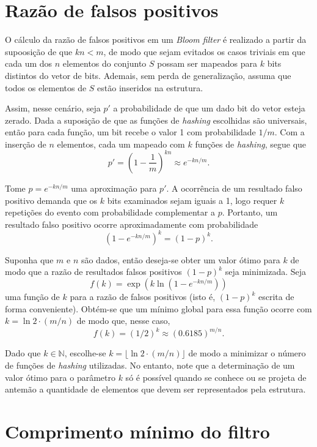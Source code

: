 \documentclass[12pt,twoside,english,brazilian]{book}
\begin{document}
\section{Razão de falsos positivos}

O cálculo da razão de falsos positivos em um \textit{Bloom filter} é realizado a partir da supoosição de que $kn < m$, de modo que sejam evitados os casos triviais em que cada um dos $n$ elementos do conjunto $S$ possam ser mapeados para $k$ bits distintos do vetor de bits. Ademais, sem perda de generalização, assuma que todos os elementos de $S$ estão inseridos na estrutura.

Assim, nesse cenário, seja $p'$ a probabilidade de que um dado bit do vetor esteja zerado. Dada a suposição de que as funções de \textit{hashing} escolhidas são universais, então para cada função, um bit recebe o valor 1 com probabilidade $1/m$. Com a inserção de $n$ elementos, cada um mapeado com $k$ funções de \textit{hashing}, segue que $$p' = \left( 1 - \frac{1}{m}\right)^{kn} \approx e^{-kn/m}.$$

Tome $p = e^{-kn/m}$ uma aproximação para $p'$. A ocorrência de um resultado falso positivo demanda que os $k$ bits examinados sejam iguais a 1, logo requer $k$ repetições do evento com probabilidade complementar a $p$. Portanto, um resultado falso positivo ocorre aproximadamente com probabilidade $$\left( 1 - e^{-kn/m} \right)^{k} = (1-p)^k.$$

Suponha que $m$ e $n$ são dados, então deseja-se obter um valor ótimo para $k$ de modo que a razão de resultados falsos positivos $(1-p)^k$ seja minimizada. Seja $$f(k) = \exp\left(k\ln(1-e^{-kn/m})\right)$$ uma função de $k$ para a razão de falsos positivos (isto é, $(1-p)^k$ escrita de forma conveniente). Obtém-se que um mínimo global para essa função ocorre com $k = \ln 2 \cdot (m/n)$ de modo que, nesse caso, $$f(k) = (1/2)^k \approx (0.6185)^{m/n}.$$

Dado que $k \in \mathbb{N}$, escolhe-se $k = \lfloor \ln 2 \cdot (m/n) \rfloor$ de modo a minimizar o número de funções de \textit{hashing} utilizadas. No entanto, note que a determinação de um valor ótimo para o parâmetro $k$ só é possível quando se conhece ou se projeta de antemão a quantidade de elementos que devem ser representados pela estrutura.

\section{Comprimento mínimo do filtro}
\end{document}
